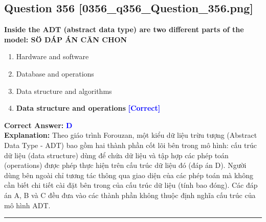 \documentclass[11pt,a4paper]{article}
\begin{document}
\begin{minipage}{\textwidth}
\subsection*{Question 356 \quad \footnotesize{[0356\_q356\_Question\_356.png]}}
\noindent \textbf{Inside the ADT (abstract data type) are two different parts of the model: SÖ DÁP ÁN CÃN CHON}

\begin{enumerate}[label=\Alph*.]
    \item Hardware and software
    \item Database and operations
    \item Data structure and algorithms
    \item \textbf{Data structure and operations} \hfill \textcolor{blue}{\textbf{[Correct]}}
\end{enumerate}

\noindent \textbf{Correct Answer:} \textcolor{blue}{\textbf{D}} \\[2pt]
\noindent \textbf{Explanation:} Theo giáo trình Forouzan, một kiểu dữ liệu trừu tượng (Abstract Data Type - ADT) bao gồm hai thành phần cốt lõi bên trong mô hình: cấu trúc dữ liệu (data structure) dùng để chứa dữ liệu và tập hợp các phép toán (operations) được phép thực hiện trên cấu trúc dữ liệu đó (đáp án D). Người dùng bên ngoài chỉ tương tác thông qua giao diện của các phép toán mà không cần biết chi tiết cài đặt bên trong của cấu trúc dữ liệu (tính bao đóng). Các đáp án A, B và C đều đưa vào các thành phần không thuộc định nghĩa cấu trúc của mô hình ADT.

\par\vspace{0.3cm}
\hrule
\vspace{0.3cm}
\end{minipage}
\end{document}
